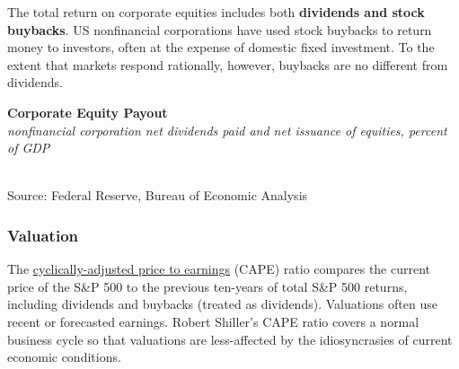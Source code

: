 \documentclass{report}
\makeatletter
\newcommand{\tbllink}[1]{\href{https://raw.githubusercontent.com/bdecon/US-chartbook/master/chartbook/data/#1}{\faTable}}
\newcommand*\short[1]{\expandafter\@gobbletwo\number\numexpr#1\relax}
\newcommand{\sbar}[4]{
		\addplot[ybar stacked, bar width=2.4pt, draw opacity=0, fill=#1] 
			table [x=#2, y=#3, col sep=comma]{#4};}
\newcommand{\dateaxisticks}{
		date coordinates in=x, axis line style={draw=none},
		xmax={2022-10-31},
		max space between ticks=40,	    
		xtick={{1990-01-01}, {1992-01-01}, {1994-01-01}, 
			{1996-01-01}, {1998-01-01}, {2000-01-01}, 
			{2002-01-01}, {2004-01-01}, {2006-01-01},
			{2008-01-01}, {2010-01-01}, {2012-01-01}, {2014-01-01},
		    {2016-01-01}, {2018-01-01}, {2020-01-01}, {2022-01-01}, 
		    {2024-01-01}, {2026-01-01}},
		minor xtick={{1989-01-01}, {1991-01-01}, {1993-01-01},
			{1995-01-01}, {1997-01-01}, {1999-01-01}, 
			{2001-01-01}, {2003-01-01}, {2005-01-01}, {2007-01-01},
		    {2009-01-01}, {2011-01-01}, {2013-01-01}, {2015-01-01},
		    {2017-01-01}, {2019-01-01}, {2021-01-01}, {2023-01-01}, 
		    {2025-01-01}, {2027-01-01}},
		enlarge y limits={0.06}, enlarge x limits={0.01},
		}
\newcommand{\bbar}[2]{extra #1 ticks = {{#2}}, extra #1 tick labels = ,
		extra #1 tick style = {grid=major, grid style={thick, black!25}},}
\newcommand{\rbars}{
		\fill[color=black!10] (axis cs:{1990-07-01},\pgfkeysvalueof{/pgfplots/ymin}) rectangle 
			(axis cs:{1991-03-01}, \pgfkeysvalueof{/pgfplots/ymax});
		\fill[color=black!10] (axis cs:{2007-12-01},\pgfkeysvalueof{/pgfplots/ymin}) rectangle 
			(axis cs:{2009-07-01}, \pgfkeysvalueof{/pgfplots/ymax});
		\fill[color=black!10] (axis cs:{2001-03-01},\pgfkeysvalueof{/pgfplots/ymin}) rectangle 
			(axis cs:{2001-11-01}, \pgfkeysvalueof{/pgfplots/ymax});
		\fill[color=black!10] (axis cs:{2020-02-01},\pgfkeysvalueof{/pgfplots/ymin}) rectangle 
			(axis cs:{2020-05-01}, \pgfkeysvalueof{/pgfplots/ymax});}
\makeatother
\begin{document}
{\begin{minipage}{0.76\textwidth}
\small The total return on corporate equities includes both \textbf{dividends and stock buybacks}. US nonfinancial corporations have used stock buybacks to return money to investors, often at the expense of domestic fixed investment. To the extent that markets respond rationally, however, buybacks are no different from dividends. 


\vspace{1mm}

\normalsize \textbf{Corporate Equity Payout}\\
\footnotesize{\textit{nonfinancial corporation net dividends paid and net issuance of equities, percent of GDP}}\\
\hspace*{-2mm} \\
\footnotesize{Source: Federal Reserve, Bureau of Economic Analysis} \hfill \tbllink{eq_payout.csv}
\end{minipage}
\newpage
\begin{minipage}{0.76\textwidth}
\subsubsection*{Valuation}
\small The \href{http://www.econ.yale.edu/~shiller/data.htm}{cyclically-adjusted price to earnings} (CAPE) ratio compares the current price of the S\&P 500 to the previous ten-years of total S\&P 500 returns, including dividends and buybacks (treated as dividends). Valuations often use recent or forecasted earnings. Robert Shiller's CAPE ratio covers a normal business cycle so that valuations are less-affected by the idiosyncrasies of current economic conditions. 


\vspace{1mm}


\end{minipage}}
\end{document}
